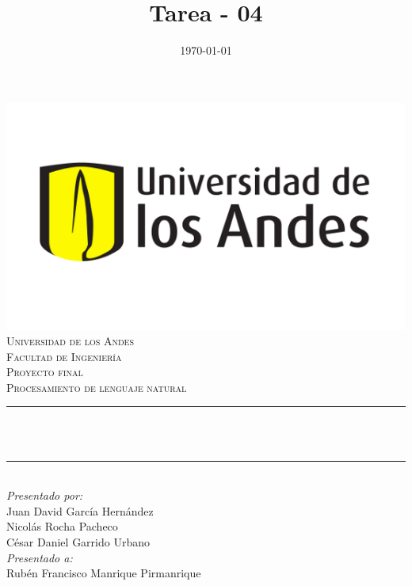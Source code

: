 \documentclass[12pt]{article}
\title{Tarea - 04}
\date{\today}
\makeatletter
\let\thetitle\@title
\makeatother
\begin{document}
    \pagestyle{fancy}
    \fancyhf{}

    \renewcommand{\headrulewidth}{0.7pt}
\fancyfoot[R]{\thepage}

\begin{titlepage}
	\centering
    \includegraphics[scale = 0.45]{images/Logo.png}\\[0.5 cm]	%
    \textsc{\large Universidad de los Andes\\
        \vspace{0.2cm} 
        Facultad de Ingeniería\\
        \vspace{0.3cm} 
        Proyecto final}\\[2.0 cm]	%
	\textsc{\Large Procesamiento de lenguaje natural}\\[0.5 cm]
	\rule{\linewidth}{0.2 mm} \\[0.4 cm]
	{ \LARGE \bfseries \thetitle}\\
	\rule{\linewidth}{0.2 mm} \\[1.5 cm]
	
	\large
			\emph{Presentado por:} \\
			Juan David García Hernández\\
			Nicolás Rocha Pacheco\\
			César Daniel Garrido Urbano\\
			
	\vfill
	\large
			\emph{Presentado a:}\\
			Rubén Francisco Manrique Pirmanrique\\
\end{titlepage}
\end{document}
